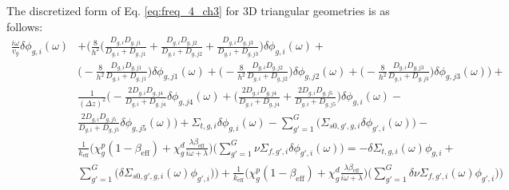 The discretized form of Eq. \ref{eq:freq_4_ch3} for 3D triangular geometries is as follows:
\begin{equation}
        \begin{aligned}
                \frac{i \omega}{v_g} \delta \phi_{g,i} (\omega) &+ \biggl( \frac{8}{h^2} \biggl( \frac{D_{g,i}D_{g,j1}}{D_{g,i}+D_{g,j1}} + \frac{D_{g,i}D_{g,j2}}{D_{g,i}+D_{g,j2}} + \frac{D_{g,i}D_{g,j3}}{D_{g,i}+D_{g,j3}} \biggr) \delta \phi_{g,i}(\omega) +\\ 
                &\biggl(-\frac{8}{h^2}\frac{D_{g,i}D_{g,j1}}{D_{g,i}+D_{g,j1}}\biggr) \delta \phi_{g,j1}(\omega) + \biggl(-\frac{8}{h^2}\frac{D_{g,i}D_{g,j2}}{D_{g,i}+D_{g,j2}}\biggr) \delta \phi_{g,j2}(\omega) + \biggl(-\frac{8}{h^2}\frac{D_{g,i}D_{g,j3}}{D_{g,i}+D_{g,j3}}\biggr) \delta \phi_{g,j3}(\omega) \biggr) + \\ 
                &\frac{1}{(\Delta z)^2} \biggl( -\frac{2D_{g,i}D_{g,j4}}{D_{g,i}+D_{g,j4}} \delta \phi_{g,j4}(\omega) + \biggl(\frac{2D_{g,i}D_{g,j4}}{D_{g,i}+D_{g,j4}}+\frac{2D_{g,i}D_{g,j5}}{D_{g,i}+D_{g,j5}}\biggr) \delta \phi_{g,i}(\omega) - \\
                &\frac{2D_{g,i}D_{g,j5}}{D_{g,i}+D_{g,j5}} \delta \phi_{g,j5}(\omega) \biggr) + \Sigma_{t,g,i} \delta \phi_{g,i}(\omega) - \sum_{g' = 1}^{G} \biggl(\Sigma_{s0,g',g,i} \delta \phi_{g',i}(\omega) \biggr) - \\
                &\frac{1}{k_{\text{eff}}} \biggl( \chi^p_g (1-\beta_{\text{eff}}) + \chi^d_g \frac{\lambda \beta_{\text{eff}}}{i \omega + \lambda} \biggr)  \biggl(\sum_{g' = 1}^{G} \nu \Sigma_{f,g',i} \delta \phi_{g',i}(\omega) \biggr)= - \delta \Sigma_{t,g,i}(\omega) \phi_{g,i} + \\
                &\sum_{g' = 1}^{G} \biggl(\delta \Sigma_{s0,g',g,i}(\omega) \phi_{g',i}) \biggr) + \frac{1}{k_{\text{eff}}} \biggl( \chi^p_g (1-\beta_{\text{eff}}) + \chi^d_g \frac{\lambda \beta_{\text{eff}}}{i \omega + \lambda} \biggr)  \biggl( \sum_{g' = 1}^{G} \delta \nu \Sigma_{f,g',i}(\omega) \phi_{g',i}) \biggr)
        \end{aligned}
        \label{eq:noise_3D_tri_disc}
\end{equation}


